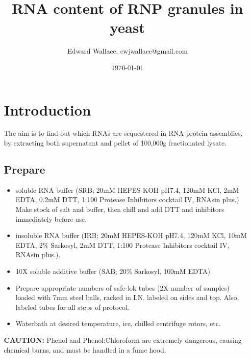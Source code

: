 \documentclass{article}
\begin{document}
\title{RNA content of RNP granules in yeast}
\author{Edward Wallace, ewjwallace@gmail.com}
\date{\today}
\maketitle


\section*{Introduction}

The aim is to find out which RNAs are sequestered in RNA-protein assemblies, by extracting both supernatant and pellet of 100,000g fractionated lysate. %

\subsection*{Prepare}

\begin{itemize}
  \item soluble RNA buffer (SRB; 20mM HEPES-KOH pH7.4, 120mM KCl, 2mM EDTA, 0.2mM DTT, 1:100 Protease Inhibitors cocktail IV, RNAsin plus.) Make stock of salt and buffer, then chill and add DTT and inhibitors immediately before use.
  \item insoluble RNA buffer (IRB; 20mM HEPES-KOH pH7.4, 120mM KCl, 10mM EDTA, 2\% Sarkosyl, 2mM DTT, 1:100 Protease Inhibitors cocktail IV, RNAsin plus.). 
  \item 10X soluble additive buffer (SAB; 20\% Sarkosyl, 100mM EDTA) 
  \item Prepare appropriate numbers of safe-lok tubes (2X number of samples) loaded with 7mm steel balls, racked in LN, labeled on sides and top. Also, labeled tubes for all steps of protocol.
  \item Waterbath at desired temperature, ice, chilled centrifuge rotors, etc.
\end{itemize}

\textbf{CAUTION:} Phenol and Phenol:Chloroform are extremely dangerous, causing chemical burns, and must be handled in a fume hood.
\end{document}
